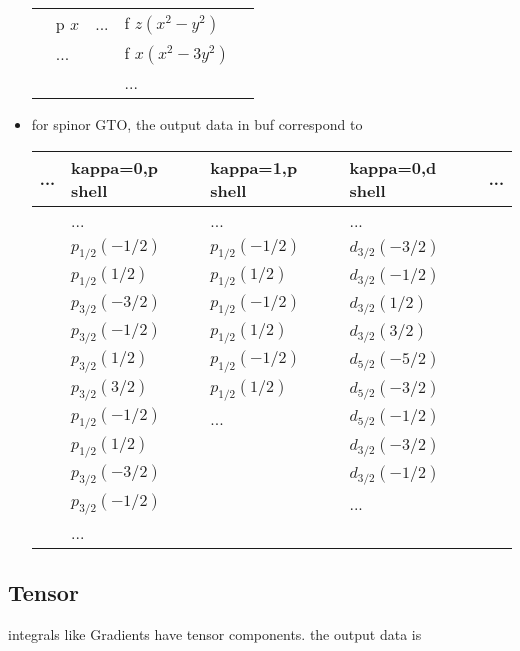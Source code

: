 \documentclass{article}
\begin{document}
\begin{itemize}
\begin{tabular}{l|l|l|l|l}
            & p $x$   & ...         & f $z(x^2-y^2) $ & \\
            & ...     &             & f $x(x^2-3y^2)$ & \\
            &         &             & ...             & \\
\hline
\end{tabular}
\item
  for spinor GTO, the output data in buf correspond
  to\\\begin{tabular}{l|l|l|l|l}
\hline
    ... & kappa=0,p shell & kappa=1,p shell & kappa=0,d shell & ... \\
\hline
        & ...             & ...             & ...             &     \\
        & $p_{1/2}(-1/2)$ & $p_{1/2}(-1/2)$ & $d_{3/2}(-3/2)$ &     \\
        & $p_{1/2}( 1/2)$ & $p_{1/2}( 1/2)$ & $d_{3/2}(-1/2)$ &     \\
        & $p_{3/2}(-3/2)$ & $p_{1/2}(-1/2)$ & $d_{3/2}( 1/2)$ &     \\
        & $p_{3/2}(-1/2)$ & $p_{1/2}( 1/2)$ & $d_{3/2}( 3/2)$ &     \\
        & $p_{3/2}( 1/2)$ & $p_{1/2}(-1/2)$ & $d_{5/2}(-5/2)$ &     \\
        & $p_{3/2}( 3/2)$ & $p_{1/2}( 1/2)$ & $d_{5/2}(-3/2)$ &     \\
        & $p_{1/2}(-1/2)$ & ...             & $d_{5/2}(-1/2)$ &     \\
        & $p_{1/2}( 1/2)$ &                 & $d_{3/2}(-3/2)$ &     \\
        & $p_{3/2}(-3/2)$ &                 & $d_{3/2}(-1/2)$ &     \\
        & $p_{3/2}(-1/2)$ &                 & ...             &     \\
        & ...             &                 &                 &     \\
\hline
\end{tabular}
\end{itemize}
\subsection{Tensor}

integrals like Gradients have tensor components. the output data
is
\end{document}
